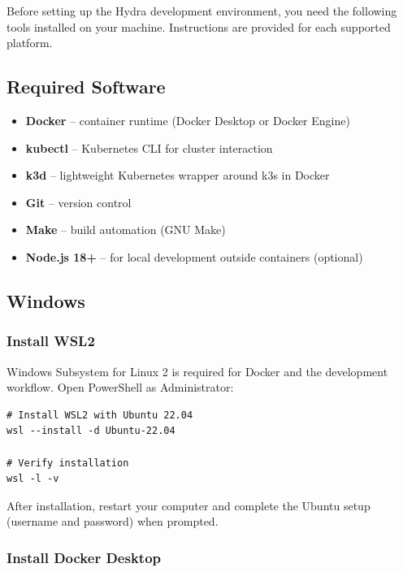 \documentclass[11pt,a4paper]{article}
\begin{document}
Before setting up the Hydra development environment, you need the following
tools installed on your machine. Instructions are provided for each supported
platform.

\subsection{Required Software}

\begin{itemize}[leftmargin=2em]
    \item \textbf{Docker} -- container runtime (Docker Desktop or Docker Engine)
    \item \textbf{kubectl} -- Kubernetes CLI for cluster interaction
    \item \textbf{k3d} -- lightweight Kubernetes wrapper around k3s in Docker
    \item \textbf{Git} -- version control
    \item \textbf{Make} -- build automation (GNU Make)
    \item \textbf{Node.js 18+} -- for local development outside containers (optional)
\end{itemize}

\subsection{Windows}
\label{sec:prereq-windows}

\subsubsection{Install WSL2}

Windows Subsystem for Linux 2 is required for Docker and the development
workflow. Open PowerShell as Administrator:

\begin{lstlisting}[style=bash]
# Install WSL2 with Ubuntu 22.04
wsl --install -d Ubuntu-22.04

# Verify installation
wsl -l -v
\end{lstlisting}

After installation, restart your computer and complete the Ubuntu setup
(username and password) when prompted.

\subsubsection{Install Docker Desktop}
\end{document}

